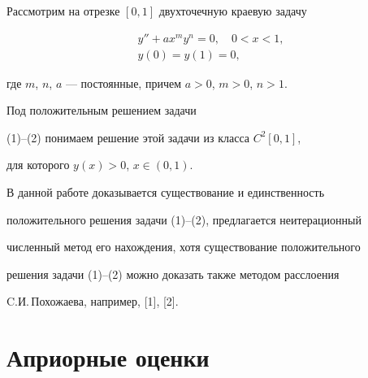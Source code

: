 \date{}







\pagestyle{plain} %













\maketitle


\label{begin}





     


Рассмотрим на отрезке $[0,1]$ двухточечную краевую задачу


\begin{gather}


y''+ax^my^n = 0,\quad 0 < x < 1,\tag{1}\\


y(0)=y(1)=0,\tag{2}


\end{gather}


где $m$, $n$, $a$ --- постоянные, причем $a>0$, $m>0$, $n>1$.


Под положительным решением задачи 


(1)--(2) понимаем решение этой задачи из класса $C^2[0,1]$, 


для которого $y(x)>0$, $x\in(0,1)$.





В данной работе доказывается существование и единственность


положительного решения задачи (1)--(2), предлагается неитерационный


численный метод его нахождения, хотя существование положительного 


решения задачи (1)--(2) можно доказать также методом расслоения 


C.И.\,Похожаева, например, [1], [2]. 





\section{Априорные оценки}





